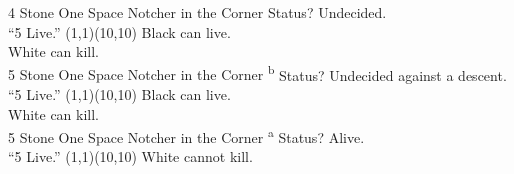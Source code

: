 \documentclass[12pt]{letter}
\begin{document}
\makeflashcardwithboards
  {\Large4 Stone One Space Notcher in the Corner}
  {Status?}
  {Undecided.\\``5 Live.''}
  {(1,1)(10,10)}
  {
       
       
       
  }
  {Black can live.\\\null}
  {  }
  {White can kill.\\\null}
  {   }
\makeflashcardwithboards
  {\Large5 Stone One Space Notcher in the Corner \textsuperscript{b}}
  {Status?}
  {Undecided against a descent.\\``5 Live.''}
  {(1,1)(10,10)}
  {
       
     
       
       
  }
  {Black can live.\\\null}
  {  }
  {White can kill.\\\null}
  {    }
\makeflashcardwithboards
  {\Large5 Stone One Space Notcher in the Corner \textsuperscript{a}}
  {Status?}
  {Alive.\\``5 Live.''}
  {(1,1)(10,10)}
  {
       
     
       
       
  }
  {White cannot kill.\\\null}
  {     }
  {}
  {}
\end{document}
